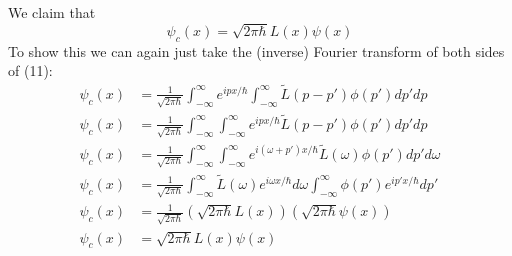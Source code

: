 \documentclass[]{book}
\begin{document}
\begin{enumerate}[(a)]
\begin{equation}
\end{equation}
We claim that
\begin{equation}%
\psi_c(x)=\sqrt{2\pi\hbar}L(x)\psi(x)
\end{equation}
To show this we can again just take the (inverse) Fourier transform of both sides of (11):
\begin{equation}%
\begin{split}
\psi_c(x) &= \frac{1}{\sqrt{2\pi\hbar}}\int_{-\infty}^{\infty}e^{ipx/\hbar}\int_{-\infty}^{\infty}\tilde{L}(p-p')\phi(p')dp'dp \\
\psi_c(x) &= \frac{1}{\sqrt{2\pi\hbar}}\int_{-\infty}^{\infty}\int_{-\infty}^{\infty}e^{ipx/\hbar}\tilde{L}(p-p')\phi(p')dp'dp \\
\psi_c(x) &= \frac{1}{\sqrt{2\pi\hbar}}\int_{-\infty}^{\infty}\int_{-\infty}^{\infty}e^{i(\omega+p')x/\hbar}\tilde{L}(\omega)\phi(p')dp'd\omega \\
\psi_c(x) &= \frac{1}{\sqrt{2\pi\hbar}}\int_{-\infty}^{\infty}\tilde{L}(\omega)e^{i\omega x/\hbar}d\omega \int_{-\infty}^{\infty}\phi(p')e^{ip'x/\hbar}dp' \\
\psi_c(x)&= \frac{1}{\sqrt{2\pi\hbar}}(\sqrt{2\pi\hbar}L(x))(\sqrt{2\pi\hbar}\psi(x)) \\ 
\psi_c(x) &= \sqrt{2\pi\hbar}L(x)\psi(x) \\ 
\end{split}
\end{equation}


\end{enumerate}
\end{document}
